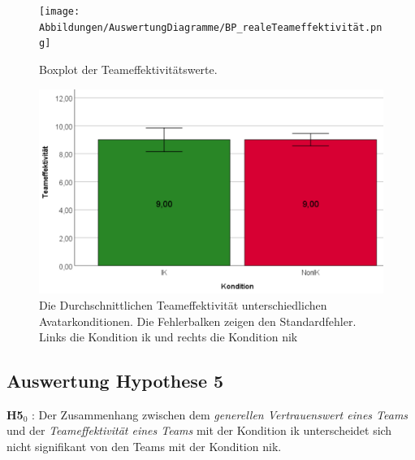 \documentclass[a4paper,11pt]{article}%
\renewcommand{\\}{\vspace*{0.5\baselineskip} \newline}
\begin{document}
	\begin{figure}[H]
   \begin{minipage}[t]{.5\linewidth} %
      \texttt{[image: Abbildungen/AuswertungDiagramme/BP\_realeTeameffektivität.png]}
      \caption[Boxplot der Teameffektivitätswerte]{Boxplot der Teameffektivitätswerte.}
            \label{SD_TeameffektivitätBP}
   \end{minipage}
   \hspace{.02\linewidth}%
   \begin{minipage}[t]{.5\linewidth} %
     \includegraphics[width=\linewidth]{Abbildungen/AuswertungDiagramme/H4_Mittelwerte.png}
      \caption[Mittelwerte und der Standardfehler der Teameffektivität]{Die Durchschnittlichen Teameffektivität unterschiedlichen Avatarkonditionen. Die Fehlerbalken zeigen den Standardfehler. Links die Kondition \ac{ik} und rechts die Kondition \ac{nik}}
       \label{H4_Mittelwerte_Auswertung}
   \end{minipage}
\end{figure}

\newpage
	\subsection{Auswertung Hypothese 5}

\textbf{H5$_{0}$} : Der Zusammenhang zwischen dem \textit{generellen Vertrauenswert eines Teams} und der \textit{Teameffektivität eines Teams} mit der Kondition \ac{ik} unterscheidet sich nicht signifikant von den Teams mit der Kondition \ac{nik}. \\
\end{document}
